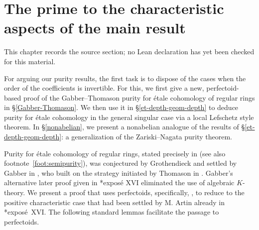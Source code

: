 \chapter{The prime to the characteristic aspects of the main result}
\label{purity-flat-cohomology-chapter-03}

\begin{remark}
\label{purity-flat-cohomology-chapter-03-source}
This chapter records the source section; no Lean declaration has yet been checked for this material.
\notready
\end{remark}

For arguing our purity results, the first task is to dispose of the cases when the order of the coefficients is invertible. For this, we first give a new, perfectoid-based proof of the Gabber--Thomason purity for \'{e}tale cohomology of regular rings in \S\ref{Gabber-Thomason}. We then use it in \S\ref{et-depth-geom-depth} to deduce purity for \'{e}tale cohomology in the general singular case via a local Lefschetz style theorem. In \S\ref{nonabelian}, we present a nonabelian analogue of the results of \S\ref{et-depth-geom-depth}: a generalization of the Zariski--Nagata purity theorem.








 


Purity for \'{e}tale cohomology of regular rings, stated precisely in  (see also footnote~\ref{foot:semipurity}), was conjectured by Grothendieck and settled by Gabber in \cite{Fuj02}, who built on the strategy initiated by Thomason in \cite{Tho84}. Gabber's alternative later proof given in \cite{ILO14}*{expos\'{e} XVI} eliminated the use of algebraic $K$-theory. We present a proof that uses perfectoids, specifically, , to reduce to the positive characteristic case that had been settled by M. Artin already in \cite{SGA4III}*{expos\'{e}~XVI}. The following standard lemmas facilitate the passage to perfectoids.



